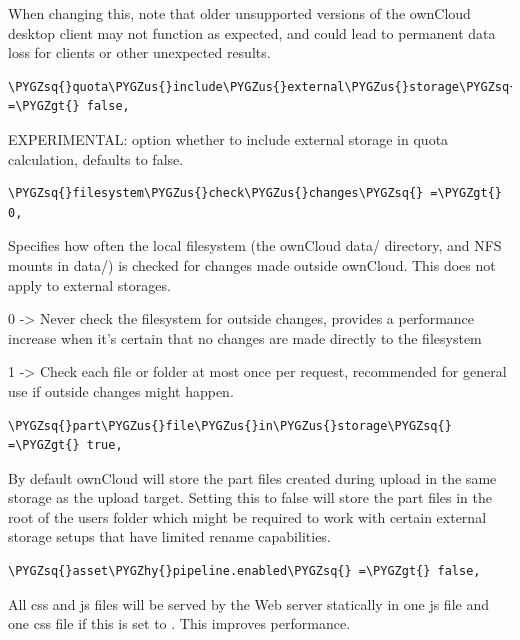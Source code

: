 \documentclass[letterpaper,10pt,english]{sphinxmanual}
\def\PYGZus{\char`\_}
\def\PYGZgt{\char`\>}
\def\PYGZhy{\char`\-}
\def\PYGZsq{\char`\'}
\begin{document}
When changing this, note that older unsupported versions of the ownCloud desktop
client may not function as expected, and could lead to permanent data loss for
clients or other unexpected results.

\begin{Verbatim}[commandchars=\\\{\}]
\PYGZsq{}quota\PYGZus{}include\PYGZus{}external\PYGZus{}storage\PYGZsq{} =\PYGZgt{} false,
\end{Verbatim}

EXPERIMENTAL: option whether to include external storage in quota
calculation, defaults to false.

\begin{Verbatim}[commandchars=\\\{\}]
\PYGZsq{}filesystem\PYGZus{}check\PYGZus{}changes\PYGZsq{} =\PYGZgt{} 0,
\end{Verbatim}

Specifies how often the local filesystem (the ownCloud data/ directory, and
NFS mounts in data/) is checked for changes made outside ownCloud. This
does not apply to external storages.

0 -\textgreater{} Never check the filesystem for outside changes, provides a performance
increase when it's certain that no changes are made directly to the
filesystem

1 -\textgreater{} Check each file or folder at most once per request, recommended for
general use if outside changes might happen.

\begin{Verbatim}[commandchars=\\\{\}]
\PYGZsq{}part\PYGZus{}file\PYGZus{}in\PYGZus{}storage\PYGZsq{} =\PYGZgt{} true,
\end{Verbatim}

By default ownCloud will store the part files created during upload in the
same storage as the upload target. Setting this to false will store the part
files in the root of the users folder which might be required to work with certain
external storage setups that have limited rename capabilities.

\begin{Verbatim}[commandchars=\\\{\}]
\PYGZsq{}asset\PYGZhy{}pipeline.enabled\PYGZsq{} =\PYGZgt{} false,
\end{Verbatim}

All css and js files will be served by the Web server statically in one js
file and one css file if this is set to . This improves performance.
\end{document}
